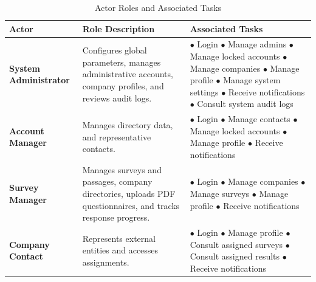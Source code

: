 \documentclass[12pt,a4paper]{report}
\begin{document}
\begin{table}[H]
\centering
\caption{Actor Roles and Associated Tasks}
\vspace{0.3cm}
\renewcommand{\arraystretch}{1.4}
\begin{tabular}{|>{\centering\arraybackslash}m{3.2cm}|>{\centering\arraybackslash}m{5.5cm}|m{6.3cm}|}
\hline
\textbf{Actor} & \textbf{Role Description} & \textbf{Associated Tasks} \\ \hline
\textbf{System Administrator} & Configures global parameters, manages administrative accounts, company profiles, and reviews audit logs. & 
$\bullet$ Login \newline
$\bullet$ Manage admins \newline
$\bullet$ Manage locked accounts \newline
$\bullet$ Manage companies \newline
$\bullet$ Manage profile \newline
$\bullet$ Manage system settings \newline
$\bullet$ Receive notifications \newline
$\bullet$ Consult system audit logs \\ \hline
\textbf{Account Manager} & Manages directory data, and representative contacts. & 
$\bullet$ Login \newline
$\bullet$ Manage contacts \newline
$\bullet$ Manage locked accounts \newline
$\bullet$ Manage profile \newline
$\bullet$ Receive notifications \\ \hline
\textbf{Survey Manager} & Manages surveys and passages, company directories, uploads PDF questionnaires, and tracks response progress. & 
$\bullet$ Login \newline
$\bullet$ Manage companies \newline
$\bullet$ Manage surveys \newline
$\bullet$ Manage profile \newline
$\bullet$ Receive notifications \\ \hline
\textbf{Company Contact} & Represents external entities and accesses assignments. & 
$\bullet$ Login \newline
$\bullet$ Manage profile \newline
$\bullet$ Consult assigned surveys \newline
$\bullet$ Consult assigned results \newline
$\bullet$ Receive notifications \\ \hline
\end{tabular}
\end{table}
\newpage
\end{document}
